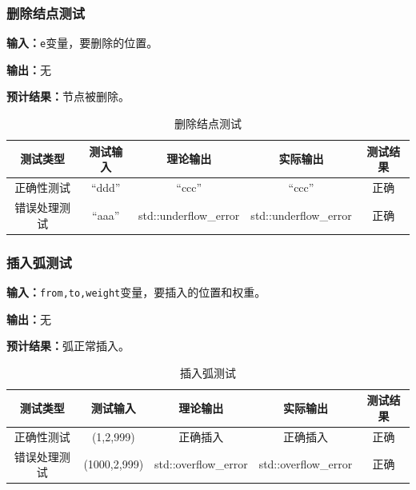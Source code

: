 \subsubsection{删除结点测试}
\textbf{输入：}\texttt{e}变量，要删除的位置。
\par
\textbf{输出：}无
\par
\textbf{预计结果：}节点被删除。
\begin{table}[h]
    \centering
    \caption{删除结点测试}
    \begin{tabular}{@{}ccccc@{}}
        \toprule
        \multicolumn{1}{c}{测试类型}    & \multicolumn{1}{c}{测试输入} & \multicolumn{1}{c}{理论输出} & \multicolumn{1}{c}{实际输出} &
        \multicolumn{1}{c}{测试结果} \\ \midrule
        \multicolumn{1}{c|}{正确性测试}  & ``ddd''&``ccc''&``ccc''&正确\\
        \multicolumn{1}{c|}{错误处理测试} & ``aaa''& std::underflow\_error& std::underflow\_error& 正确\\ \bottomrule
    \end{tabular}
    \label{tab:priortest4}
\end{table}

\subsubsection{插入弧测试}
\textbf{输入：}\texttt{from,to,weight}变量，要插入的位置和权重。
\par
\textbf{输出：}无
\par
\textbf{预计结果：}弧正常插入。
\begin{table}[h]
    \centering
    \caption{插入弧测试}
    \begin{tabular}{@{}ccccc@{}}
        \toprule
        \multicolumn{1}{c}{测试类型}    & \multicolumn{1}{c}{测试输入} & \multicolumn{1}{c}{理论输出} & \multicolumn{1}{c}{实际输出} &
        \multicolumn{1}{c}{测试结果} \\ \midrule
        \multicolumn{1}{c|}{正确性测试}  & (1,2,999)& 正确插入 &正确插入 &正确\\
        \multicolumn{1}{c|}{错误处理测试} & (1000,2,999)& std::overflow\_error& std::overflow\_error& 正确\\ \bottomrule
    \end{tabular}
    \label{tab:nexttest4}
\end{table}

